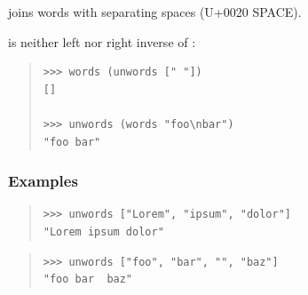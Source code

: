 \begin{haddockdesc}
\item[\begin{tabular}{@{}l}
unwords :: {\char 91}String{\char 93} -> String
\end{tabular}]
{\haddockbegindoc
{} joins words with separating spaces (U+0020 SPACE).\par
{} is neither left nor right inverse of :\par
\begin{quote}
{\haddockverb\begin{verbatim}
>>> words (unwords [" "])
[]

>>> unwords (words "foo\nbar")
"foo bar"

\end{verbatim}}
\end{quote}
\subsubsection*{\textbf{Examples}}
\begin{quote}
{\haddockverb\begin{verbatim}
>>> unwords ["Lorem", "ipsum", "dolor"]
"Lorem ipsum dolor"

\end{verbatim}}
\end{quote}
\begin{quote}
{\haddockverb\begin{verbatim}
>>> unwords ["foo", "bar", "", "baz"]
"foo bar  baz"

\end{verbatim}}
\end{quote}}
\end{haddockdesc}
